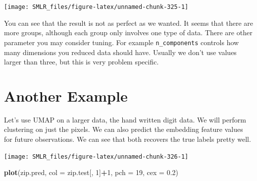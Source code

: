 \documentclass[
]{book}
\newenvironment{Shaded}{\begin{snugshade}}{\end{snugshade}}
\newcommand{\AttributeTok}[1]{\textcolor[rgb]{0.13,0.29,0.53}{#1}}
\newcommand{\DecValTok}[1]{\textcolor[rgb]{0.00,0.00,0.81}{#1}}
\newcommand{\DocumentationTok}[1]{\textcolor[rgb]{0.56,0.35,0.01}{\textbf{\textit{#1}}}}
\newcommand{\FloatTok}[1]{\textcolor[rgb]{0.00,0.00,0.81}{#1}}
\newcommand{\FunctionTok}[1]{\textcolor[rgb]{0.13,0.29,0.53}{\textbf{#1}}}
\newcommand{\NormalTok}[1]{#1}
\newcommand{\OtherTok}[1]{\textcolor[rgb]{0.56,0.35,0.01}{#1}}
\newcommand{\SpecialCharTok}[1]{\textcolor[rgb]{0.81,0.36,0.00}{\textbf{#1}}}
\theoremstyle{definition}
\theoremstyle{definition}
\theoremstyle{definition}
\theoremstyle{definition}
\theoremstyle{remark}
\begin{document}
\begin{center}\texttt{[image: SMLR\_files/figure-latex/unnamed-chunk-325-1]} \end{center}

You can see that the result is not as perfect as we wanted. It seems that there are more groups, although each group only involves one type of data. There are other parameter you may consider tuning. For example \texttt{n\_components} controls how many dimensions you reduced data should have. Usually we don't use values larger than three, but this is very problem specific.

\hypertarget{another-example}{%
\section{Another Example}\label{another-example}}

Let's use UMAP on a larger data, the hand written digit data. We will perform clustering on just the pixels. We can also predict the embedding feature values for future observations. We can see that both recovers the true labels pretty well.

\begin{Shaded}
\end{Shaded}

\begin{center}\texttt{[image: SMLR\_files/figure-latex/unnamed-chunk-326-1]} \end{center}

\begin{Shaded}
\begin{Highlighting}[]
  \FunctionTok{plot}\NormalTok{(zip.pred, }\AttributeTok{col =}\NormalTok{ zip.test[, }\DecValTok{1}\NormalTok{]}\SpecialCharTok{+}\DecValTok{1}\NormalTok{, }\AttributeTok{pch =} \DecValTok{19}\NormalTok{, }\AttributeTok{cex =} \FloatTok{0.2}\NormalTok{)}
\end{Highlighting}
\end{Shaded}
\end{document}
